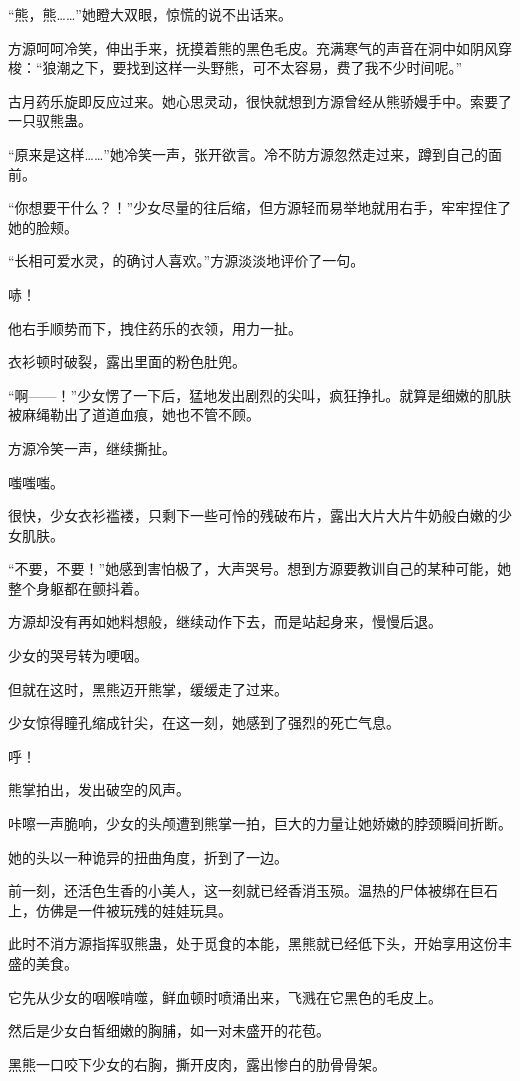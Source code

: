 \begin{this_body}
“熊，熊……”她瞪大双眼，惊慌的说不出话来。

方源呵呵冷笑，伸出手来，抚摸着熊的黑色毛皮。充满寒气的声音在洞中如阴风穿梭：“狼潮之下，要找到这样一头野熊，可不太容易，费了我不少时间呢。”

古月药乐旋即反应过来。她心思灵动，很快就想到方源曾经从熊骄嫚手中。索要了一只驭熊蛊。

“原来是这样……”她冷笑一声，张开欲言。冷不防方源忽然走过来，蹲到自己的面前。

“你想要干什么？！”少女尽量的往后缩，但方源轻而易举地就用右手，牢牢捏住了她的脸颊。

“长相可爱水灵，的确讨人喜欢。”方源淡淡地评价了一句。

哧！

他右手顺势而下，拽住药乐的衣领，用力一扯。

衣衫顿时破裂，露出里面的粉色肚兜。

“啊——！”少女愣了一下后，猛地发出剧烈的尖叫，疯狂挣扎。就算是细嫩的肌肤被麻绳勒出了道道血痕，她也不管不顾。

方源冷笑一声，继续撕扯。

嗤嗤嗤。

很快，少女衣衫褴褛，只剩下一些可怜的残破布片，露出大片大片牛奶般白嫩的少女肌肤。

“不要，不要！”她感到害怕极了，大声哭号。想到方源要教训自己的某种可能，她整个身躯都在颤抖着。

方源却没有再如她料想般，继续动作下去，而是站起身来，慢慢后退。

少女的哭号转为哽咽。

但就在这时，黑熊迈开熊掌，缓缓走了过来。

少女惊得瞳孔缩成针尖，在这一刻，她感到了强烈的死亡气息。

呼！

熊掌拍出，发出破空的风声。

咔嚓一声脆响，少女的头颅遭到熊掌一拍，巨大的力量让她娇嫩的脖颈瞬间折断。

她的头以一种诡异的扭曲角度，折到了一边。

前一刻，还活色生香的小美人，这一刻就已经香消玉殒。温热的尸体被绑在巨石上，仿佛是一件被玩残的娃娃玩具。

此时不消方源指挥驭熊蛊，处于觅食的本能，黑熊就已经低下头，开始享用这份丰盛的美食。

它先从少女的咽喉啃噬，鲜血顿时喷涌出来，飞溅在它黑色的毛皮上。

然后是少女白皙细嫩的胸脯，如一对未盛开的花苞。

黑熊一口咬下少女的右胸，撕开皮肉，露出惨白的肋骨骨架。


\end{this_body}
